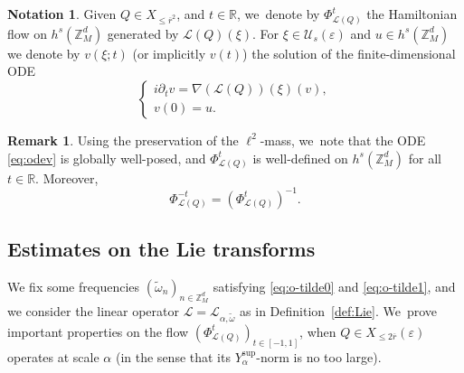 \documentclass[10pt,a4paper]{amsart}
\theoremstyle{plain}
\theoremstyle{definition}
\newtheorem{notation}[theorem]{Notation}
\newtheorem{remark}[theorem]{Remark}
\newcommand{\Z}{\mathbb{Z}}
\newcommand{\R}{\mathbb{R}}
\newcommand{\1}{\mathbf{1}}
\newcommand{\Ysup}[1]{Y_{#1}^{\mathrm{sup}}}
\let\epsilon\varepsilon
\begin{document}
\begin{notation}
Given $Q\in X_{\leq\overline{r}^{2}}$, and $t\in\R$, we~denote by $\Phi_{\mathcal{L}(Q)}^{t}$ the Hamiltonian flow on $h^s(\Z_{M}^{d})$ generated by $\mathcal{L}(Q)(\xi)$. For $\xi\in\mathcal{U}_{s}(\epsilon)$ and $u\in h^{s}(\Z_{M}^{d})$ we denote by $v(\xi;t)$ (or implicitly $v(t)$) the solution of the finite-dimensional ODE
\begin{equation}
\label{eq:odev}
\begin{cases}
i\partial_t v = \nabla(\mathcal{L}(Q))(\xi)(v),\\
v(0) = u.
\end{cases}
\end{equation}
\end{notation}

\begin{remark}
Using the preservation of the $\ell^{2}$-mass, we~note that the ODE \eqref{eq:odev} is globally well-posed, and $\Phi_{\mathcal{L}(Q)}^{t}$ is well-defined on $h^s(\Z_{M}^{d})$ for all $t\in\R$. Moreover,
\[
\Phi_{\mathcal{L}(Q)}^{-t} = (\Phi_{\mathcal{L}(Q)}^{t})^{-1}.
\]
\end{remark}

\subsection{Estimates on the Lie transforms}
\label{sec:lie-prop}
We fix some frequencies $(\widetilde{\omega}_{n})_{n\in\Z_{M}^{d}}$ satisfying \eqref{eq:o-tilde0} and \eqref{eq:o-tilde1}, and we consider the linear operator $\mathcal{L}=\mathcal{L}_{\alpha,\widetilde{\omega}}$ as in Definition~\ref{def:Lie}. We~prove important properties on the flow $(\Phi_{\mathcal{L}(Q)}^t)_{t\in[-1,1]}$, when $Q\in X_{\leq2\overline{r}}(\epsilon)$ operates at scale $\alpha$ (in the sense that its $\Ysup{\alpha}$-norm is no too large).
\end{document}
